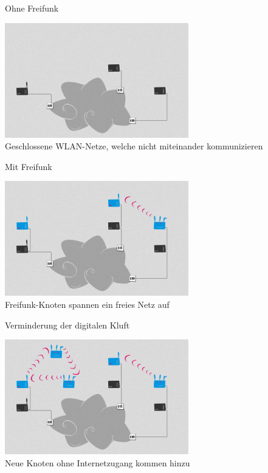 \documentclass[10pt]{beamer}
\begin{document}
  \begin{frame}{Ohne Freifunk}
    \begin{center}
      \includegraphics[height=5cm]{images/network_1}\\
      \vspace{1em}
      Geschlossene WLAN-Netze, welche nicht miteinander kommunizieren
      \vspace{1em}
    \end{center}
  \end{frame}

  \begin{frame}{Mit Freifunk}
    \begin{center}
      \includegraphics[height=5cm]{images/network_2}\\
      \vspace{1em}
      Freifunk-Knoten spannen ein freies Netz auf
      \vspace{1em}
    \end{center}
  \end{frame}

  \begin{frame}{Verminderung der digitalen Kluft}
    \begin{center}
      \includegraphics[height=5cm]{images/network_3}\\
      \vspace{1em}
      Neue Knoten ohne Internetzugang kommen hinzu
      \vspace{1em}
    \end{center}
  \end{frame}
\end{document}
